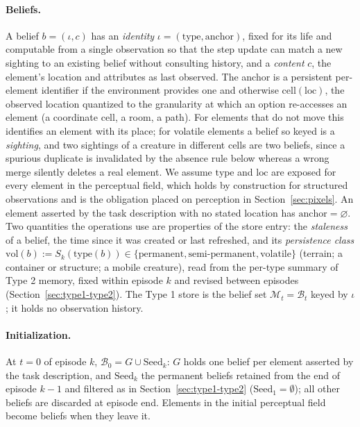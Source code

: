 \documentclass[10pt]{article}
\newcommand{\calM}{\mathcal{M}}
\newcommand{\calB}{\mathcal{B}}
\newcommand{\loc}{\mathrm{loc}}
\newcommand{\vol}{\mathrm{vol}}
\newcommand{\anchor}{\mathrm{anchor}}
\newcommand{\cell}{\mathrm{cell}}
\newcommand{\type}{\mathrm{type}}
\begin{document}
\paragraph{Beliefs.}
A belief $b=(\iota,c)$ has an \emph{identity} $\iota=(\type,\anchor)$, fixed for its life and computable from a single observation so that the step update can match a new sighting to an existing belief without consulting history, and a \emph{content} $c$, the element's location and attributes as last observed. The anchor is a persistent per-element identifier if the environment provides one and otherwise $\cell(\loc)$, the observed location quantized to the granularity at which an option re-accesses an element (a coordinate cell, a room, a path). For elements that do not move this identifies an element with its place; for volatile elements a belief so keyed is a \emph{sighting}, and two sightings of a creature in different cells are two beliefs, since a spurious duplicate is invalidated by the absence rule below whereas a wrong merge silently deletes a real element. We assume $\type$ and $\loc$ are exposed for every element in the perceptual field, which holds by construction for structured observations and is the obligation placed on perception in Section~\ref{sec:pixels}. An element asserted by the task description with no stated location has $\anchor=\varnothing$. Two quantities the operations use are properties of the store entry: the \emph{staleness} of a belief, the time since it was created or last refreshed, and its \emph{persistence class} $\vol(b):=S_k(\type(b))\in\{\mathrm{permanent},\mathrm{semi\text{-}permanent},\mathrm{volatile}\}$ (terrain; a container or structure; a mobile creature), read from the per-type summary of Type 2 memory, fixed within episode $k$ and revised between episodes (Section~\ref{sec:type1-type2}). The Type 1 store is the belief set $\calM_t=\calB_t$ keyed by $\iota$; it holds no observation history.

\paragraph{Initialization.}
At $t=0$ of episode $k$, $\calB_0=G\cup\mathrm{Seed}_k$: $G$ holds one belief per element asserted by the task description, and $\mathrm{Seed}_k$ the permanent beliefs retained from the end of episode $k-1$ and filtered as in Section~\ref{sec:type1-type2} ($\mathrm{Seed}_1=\emptyset$); all other beliefs are discarded at episode end. Elements in the initial perceptual field become beliefs when they leave it.
\end{document}
